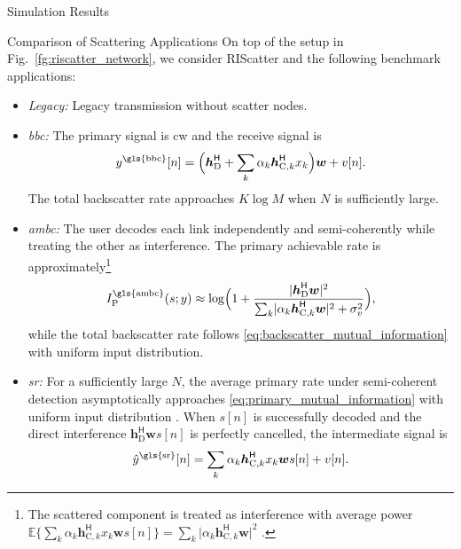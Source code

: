 \begin{section}{Simulation Results}
	\begin{subsection}{Comparison of Scattering Applications}
		On top of the setup in Fig.~\ref{fg:riscatter_network}, we consider RIScatter and the following benchmark applications:
		\begin{itemize}
			\item \emph{Legacy:} Legacy transmission without scatter nodes.
			\item \emph{\gls{bbc}:} The primary signal is \gls{cw} and the receive signal is
			\begin{equation}
				y^{\text{\gls{bbc}}}[n] = \Bigl(\boldsymbol{h}_{\text{D}}^\mathsf{H} + \sum_{k} \alpha_k \boldsymbol{h}_{\text{C},k}^\mathsf{H} x_k\Bigr) \boldsymbol{w} + v[n].
			\end{equation}
			The total backscatter rate approaches $K \log M$ when $N$ is sufficiently large.
			\item \emph{\gls{ambc}:} The user decodes each link independently and semi-coherently while treating the other as interference.
			The primary achievable rate is approximately\footnote{The scattered component is treated as interference with average power $\mathbb{E}\bigl\{\sum_{k} \alpha_k \boldsymbol{h}_{\text{C},k}^\mathsf{H} x_k \boldsymbol{w}s[n]\bigr\} = \sum_{k} \lvert \alpha_k \boldsymbol{h}_{\text{C},k}^\mathsf{H} \boldsymbol{w} \rvert^2$ \cite{Long2020a}.\label{fn:ambc}}
			\begin{equation}
				I_{\text{P}}^{\text{\gls{ambc}}}(s;y) \approx \log \Bigl(1 + \frac{\lvert\boldsymbol{h}_{\text{D}}^\mathsf{H}\boldsymbol{w}\rvert^2}{\sum_{k}\lvert \alpha_k \boldsymbol{h}_{\text{C},k}^\mathsf{H} \boldsymbol{w}\rvert^2+\sigma_v^2}\Bigr),
			\end{equation}
			while the total backscatter rate follows \eqref{eq:backscatter_mutual_information} with uniform input distribution.
			\item \emph{\gls{sr}:} For a sufficiently large $N$, the average primary rate under semi-coherent detection asymptotically approaches \eqref{eq:primary_mutual_information} with uniform input distribution \cite{Long2020a}.
			When $s[n]$ is successfully decoded and the direct interference $\boldsymbol{h}_{\text{D}}^\mathsf{H} \boldsymbol{w} s[n]$ is perfectly cancelled, the intermediate signal is
			\begin{equation}
				\hat{y}^{\text{\gls{sr}}}[n] = \sum_{k} \alpha_k \boldsymbol{h}_{\text{C},k}^\mathsf{H} x_k \boldsymbol{w} s[n] + v[n].
				\label{eq:intermediate_signal}
			\end{equation}

\end{itemize}
\end{subsection}
\end{section}
